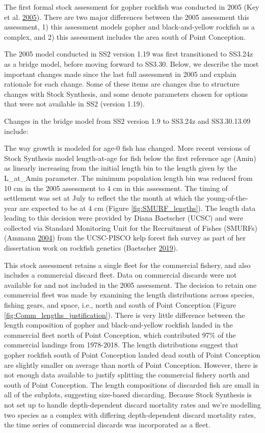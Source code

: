 \documentclass[12pt,]{article}
\begin{document}
The first formal stock assessment for gopher rockfish was conducted in
2005 (Key et al. \protect\hyperlink{ref-Key2005}{2005}). There are two
major differences between the 2005 assessment this assessment, 1) this
assessment models gopher and black-and-yellow rockfish as a complex, and
2) this assessment includes the area south of Point Conception.

The 2005 model conducted in SS2 version 1.19 was first transitioned to
SS3.24z as a bridge model, before moving forward to SS3.30. Below, we
describe the most important changes made since the last full assessment
in 2005 and explain rationale for each change. Some of these items are
changes due to structure changes with Stock Synthesis, and some denote
parameters chosen for options that were not available in SS2 (version
1.19).

Changes in the bridge model from SS2 version 1.9 to SS3.24z and
SS3.30.13.09 include:

The way growth is modeled for age-0 fish has changed. More recent
versions of Stock Synthesis model length-at-age for fish below the first
reference age (Amin) as linearly increasing from the initial length bin
to the length given by the L\_at\_Amin parameter. The minimum population
length bin was reduced from 10 cm in the 2005 assessment to 4 cm in this
assessment. The timing of settlement was set at July to reflect the the
month at which the young-of-the-year are expected to be at 4 cm (Figure
\ref{fig:SMURF_lengths}). The length data leading to this decision were
provided by Diana Baetscher (UCSC) and were collected via Standard
Monitoring Unit for the Recruitment of Fishes (SMURFs) (Ammann
\protect\hyperlink{ref-Ammann2004}{2004}) from the UCSC-PISCO kelp
forest fish survey as part of her dissertation work on rockfish genetics
(Baetscher \protect\hyperlink{ref-Baetscher2019}{2019}).

This stock assessment retains a single fleet for the commercial fishery,
and also includes a commercial discard fleet. Data on commercial
discards were not available for and not included in the 2005 assessment.
The decision to retain one commercial fleet was made by examining the
length distributions across species, fishing gears, and space, i.e.,
north and south of Point Conception (Figure
\ref{fig:Comm_lengths_justification}). There is very little difference
between the length composition of gopher and black-and-yellow rockfish
landed in the commercial fleet north of Point Conception, which
contributed 97\% of the commercial landings from 1978-2018. The length
distributions suggest that gopher rockfish south of Point Conception
landed dead south of Point Conception are slightly smaller on average
than north of Point Conception. However, there is not enough data
available to justify splitting the commercial fishery north and south of
Point Conception. The length compositions of discarded fish are small in
all of the subplots, suggesting size-based discarding. Because Stock
Synthesis is not set up to handle depth-dependent discard mortality
rates and we're modelling two species as a complex with differing
depth-dependent discard mortality rates, the time series of commercial
discards was incorporated as a fleet.
\end{document}
